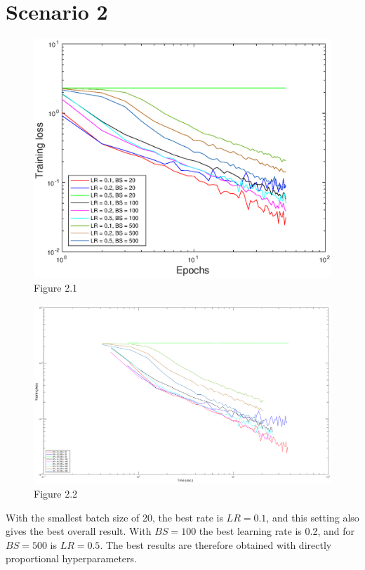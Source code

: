 \documentclass{article}
\begin{document}
\section*{Scenario 2}
	\begin{figure}[!htb]
        \centering
        \includegraphics[width=\textwidth]{figures/sc2_tr_loss}
        \captionsetup{labelformat=empty}
        \caption{Figure 2.1}
    \end{figure}
    \begin{figure}[!htb]
        \centering
        \includegraphics[width=\textwidth]{figures/sc2_tr_loss_time}
        \captionsetup{labelformat=empty}
        \caption{Figure 2.2}
    \end{figure}

    With the smallest batch size of 20, the best rate is $LR = 0.1$, and this setting also gives the best overall result. With $BS = 100$ the best learning rate is 0.2, and for $BS = 500$ is $LR = 0.5$.
    The best results are therefore obtained with directly proportional hyperparameters.
    
\end{document}
